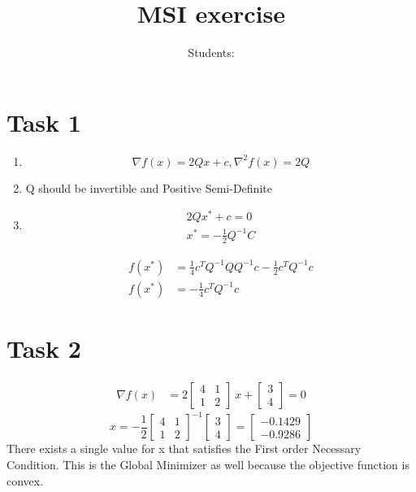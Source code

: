\documentclass[12pt]{article}
\author{} %
\title{MSI exercise \assignmentnumber}
\author{Students: \students}
\begin{document}
\maketitle	
\section{Task 1}
\begin{enumerate}
\item
\begin{equation}
\nabla f(x) = 2Qx + c, \nabla ^ 2 f(x) = 2Q 
\end{equation}
\item
Q should be invertible and Positive Semi-Definite
\item
\begin{equation}
\begin{split}
2Qx^* + c = 0 \\
x^* = -\frac{1}{2} Q^{-1}C
\end{split}
\end{equation}

\begin{equation}
\begin{split}
f(x^*) &= \frac{1}{4}c^TQ^{-1}QQ^{-1}c - \frac{1}{2}c^TQ^{-1}c \\
f(x^*) &= - \frac{1}{4}c^TQ^{-1}c
\end{split}
\end{equation} 
\end{enumerate}

\section{Task 2}
\begin{equation} 
\begin{split}
\nabla f(x) &= 2 \begin{bmatrix}
4 & 1 \\
1 & 2
\end{bmatrix} \ x + \begin{bmatrix}
3 \\
4
\end{bmatrix} = 0
\end{split} 
\end{equation}
\begin{equation}
x = -\frac{1}{2} \begin{bmatrix}
4 & 1 \\
1 & 2
\end{bmatrix}^{-1} \begin{bmatrix}
3 \\
4
\end{bmatrix} = \begin{bmatrix}
-0.1429 \\
-0.9286
\end{bmatrix}
\end{equation}
There exists a single value for x that satisfies the First order Necessary Condition. This is the Global Minimizer as well because the objective function is convex.
\end{document}

